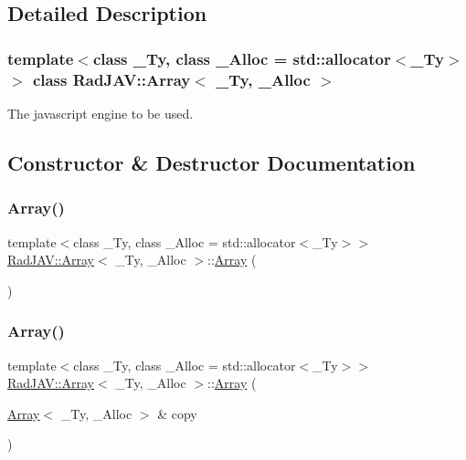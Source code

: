 \subsection{Detailed Description}
\subsubsection*{template$<$class \+\_\+\+Ty, class \+\_\+\+Alloc = std\+::allocator$<$\+\_\+\+Ty$>$$>$\newline
class Rad\+J\+A\+V\+::\+Array$<$ \+\_\+\+Ty, \+\_\+\+Alloc $>$}

The javascript engine to be used. 

\subsection{Constructor \& Destructor Documentation}
\mbox{\label{class_rad_j_a_v_1_1_array_a1a0ac18cbeb2d1075e527f08ce62e071}} 
\subsubsection{\texorpdfstring{Array()}{Array()}\hspace{0.1cm}{\footnotesize\ttfamily [1/9]}}
{\footnotesize\ttfamily template$<$class \+\_\+\+Ty, class \+\_\+\+Alloc = std\+::allocator$<$\+\_\+\+Ty$>$$>$ \\
\mbox{\hyperlink{class_rad_j_a_v_1_1_array}{Rad\+J\+A\+V\+::\+Array}}$<$ \+\_\+\+Ty, \+\_\+\+Alloc $>$\+::\mbox{\hyperlink{class_rad_j_a_v_1_1_array}{Array}} (\begin{DoxyParamCaption}{ }\end{DoxyParamCaption})\hspace{0.3cm}{\ttfamily [inline]}}

\mbox{\label{class_rad_j_a_v_1_1_array_ae78990d26916c773be8bb068665c8994}} 
\subsubsection{\texorpdfstring{Array()}{Array()}\hspace{0.1cm}{\footnotesize\ttfamily [2/9]}}
{\footnotesize\ttfamily template$<$class \+\_\+\+Ty, class \+\_\+\+Alloc = std\+::allocator$<$\+\_\+\+Ty$>$$>$ \\
\mbox{\hyperlink{class_rad_j_a_v_1_1_array}{Rad\+J\+A\+V\+::\+Array}}$<$ \+\_\+\+Ty, \+\_\+\+Alloc $>$\+::\mbox{\hyperlink{class_rad_j_a_v_1_1_array}{Array}} (\begin{DoxyParamCaption}\item[{\mbox{\hyperlink{class_rad_j_a_v_1_1_array}{Array}}$<$ \+\_\+\+Ty, \+\_\+\+Alloc $>$ \&}]{copy }\end{DoxyParamCaption})\hspace{0.3cm}{\ttfamily [inline]}}

